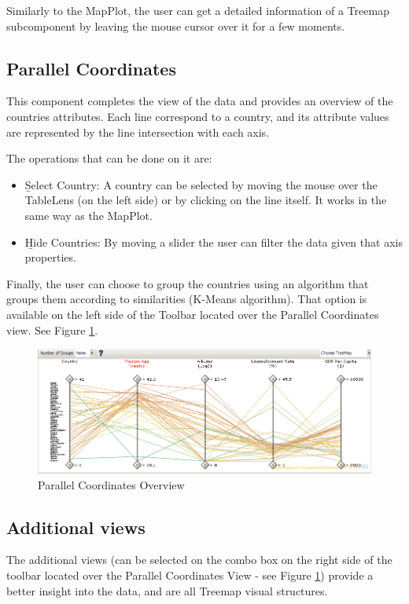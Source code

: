 \documentclass[twocolumn,8pt]{article}
\begin{document}
Similarly to the MapPlot, the user can get a detailed information of a Treemap subcomponent by leaving the mouse cursor over it for a few moments.

\subsection{Parallel Coordinates}

This component completes the view of the data and provides an overview of the countries attributes. Each line correspond to a country, and its attribute values are represented by the line intersection with each axis.

The operations that can be done on it are:

\begin{itemize}
\item {\b Select Country}: A country can be selected by moving the mouse over the TableLens (on the left side) or by clicking on the line itself. It works in the same way as the MapPlot.\\
\item {\b Hide Countries}: By moving a slider the user can filter the data given that axis properties.

\end{itemize}

Finally, the user can choose to group the countries using an algorithm that groups them according to similarities (K-Means algorithm). That option is available on the left side of the Toolbar located over the Parallel Coordinates view. See Figure \ref{fig:pcplot}.

\begin{figure}[tp]
  \begin{center}
	\includegraphics[scale=0.5]{./pics/pcplot.png}
    \caption{Parallel Coordinates Overview}
    \label{fig:pcplot}
  \end{center}
\end{figure}

\subsection{Additional views}

The additional views (can be selected on the combo box on the right side of the toolbar located over the Parallel Coordinates View - see Figure \ref{fig:pcplot}) provide a better insight into the data, and are all Treemap visual structures.
\end{document}
